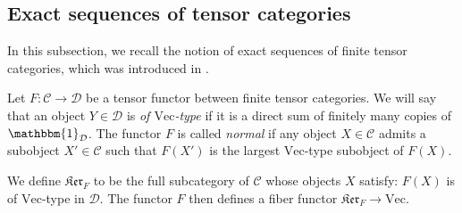 \documentclass{amsart}
\theoremstyle{plain}%
\theoremstyle{remark}
\newcommand{\C}{\mathcal{C}}
\newcommand{\1}{\mathbbm{1}}
\newcommand{\D}{\mathcal{D}}
\newcommand{\Vect}{\mathrm{Vec}}
\begin{document}
        \subsection{Exact sequences of tensor categories}\label{ssec:exact_seq_tensor_cats} In this subsection, we recall the notion of exact sequences of finite tensor categories, which was introduced in \cite{BN}. 

        Let $F:\C\to \D$ be a tensor functor between finite tensor categories. We will say that an object $Y\in \D$ is \textit{of $\Vect$-type} if it is a direct sum of finitely many copies of $\1_\D$. The functor $F$ is called \textit{normal} if any object $X\in \C$ admits a subobject $X'\in \C$ such that $F(X')$ is the largest $\Vect$-type subobject of $F(X)$. 
        
        We define $\mathfrak{Ker}_F$ to be the full subcategory of $\C$ whose objects $X$ satisfy: $F(X)$ is of $\Vect$-type in $\D$. The functor $F$ then defines a fiber functor $\mathfrak{Ker}_F\to \Vect$.
        
\end{document}
